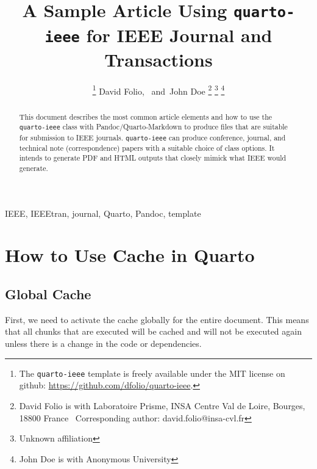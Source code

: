 \documentclass[
  journal,
]{IEEEtran}%
\title{A Sample Article Using \texttt{quarto-ieee} for IEEE Journal and
Transactions}
\author{
\thanks{The \texttt{quarto-ieee} template is freely available under the
MIT license on github: \url{https://github.com/dfolio/quarto-ieee}.}
David Folio\orcidlink{0000-0001-9430-6091},~\IEEEmembership{Member,
IEEE}
and~John Doe%
\thanks{David Folio is with Laboratoire Prisme, INSA Centre Val de
Loire, Bourges, 18800 France%
  Corresponding author: david.folio@insa-cvl.fr
}
\thanks{Unknown affiliation}
\thanks{John Doe is with Anonymous University%
}
}
\newenvironment{Shaded}{\begin{snugshade}}{\end{snugshade}}
\newcommand{\InformationTok}[1]{\textcolor[rgb]{0.37,0.37,0.37}{#1}}
\begin{document}


\maketitle

\begin{abstract}
This document describes the most common article elements and how to use
the \texttt{quarto-ieee} class with Pandoc/Quarto-Markdown to produce
files that are suitable for submission to IEEE journals.
\texttt{quarto-ieee} can produce conference, journal, and technical note
(correspondence) papers with a suitable choice of class options. It
intends to generate PDF and HTML outputs that closely mimick what IEEE
would generate.
\end{abstract}
\begin{IEEEkeywords}
IEEE, IEEEtran, journal, Quarto, Pandoc, template
\end{IEEEkeywords}

%


\section{How to Use Cache in Quarto}\label{sec-intro}

\subsection{Global Cache}\label{global-cache}

First, we need to activate the cache globally for the entire document.
This means that all chunks that are executed will be cached and will not
be executed again unless there is a change in the code or dependencies.

\begin{Shaded}
\end{Shaded}
\end{document}
